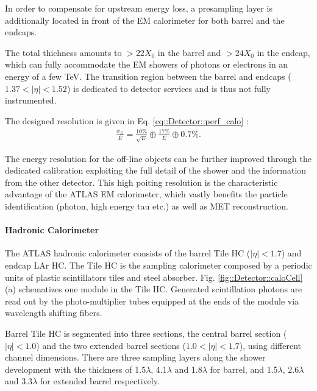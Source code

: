 In order to compensate for upstream energy loss, a presampling layer is additionally located in front of the EM calorimeter for both barrel and the endcaps.

The total thichness amounts to $>22X_0$ in the barrel and  $>24X_0$ in the endcap, which can fully accommodate the EM showers of photons or electrons in an energy of a few TeV.
The transition region between the barrel and endcaps ($1.37 < |\eta| <1.52$) is dedicated to detector services and is thus not fully instrumented.



The designed resolution is given in Eq. \ref{eq::Detector::perf_calo} \cite{ATLAS_LAr_TDR}:
\begin{align}
\frac{\sigma_E}{E} = \frac{10\%}{\sqrt{E}} \oplus \frac{17\%}{E} \oplus 0.7\%.
\label{eq::Detector::perf_calo}
\end{align}

The energy resolution for the off-line objects can be further improved through the dedicated calibration exploiting the full detail of the shower and the information from the other detector. 
This high poiting resolution is the characteristic advantage of the ATLAS EM calorimeter, which vastly benefits the particle identification (photon, high energy tau etc.) as well as MET reconstruction.



\paragraph{Hadronic Calorimeter}
The ATLAS hadronic calorimeter consists of the barrel Tile HC ($|\eta|<1.7$) and endcap LAr HC.
The Tile HC is the sampling calorimeter composed by a periodic units of plastic scintillators tiles and steel absorber.
Fig. \ref{fig::Detector::caloCell} (a) schematizes one module in the Tile HC. Generated scintillation photons are read out by the photo-multiplier tubes equipped at the ends of the module via wavelength shifting fibers. 

Barrel Tile HC is segmented into three sections, the central barrel section ($|\eta|<1.0$) and the two extended barrel sections ($1.0<|\eta|<1.7$), using different channel dimensions. There are three sampling layers along the shower development with the thickness of 1.5$\lambda$, 4.1$\lambda$ and 1.8$\lambda$ for barrel, and 1.5$\lambda$, 2.6$\lambda$ and 3.3$\lambda$ for extended barrel respectively. \\

